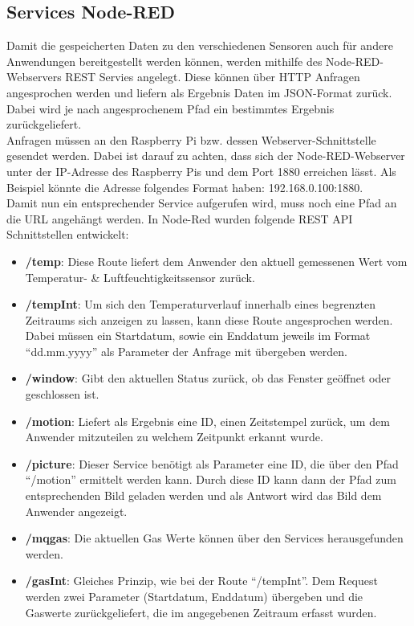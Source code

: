 \subsection{Services Node-RED}
Damit die gespeicherten Daten zu den verschiedenen Sensoren auch für andere Anwendungen bereitgestellt werden können, werden mithilfe des Node-RED-Webservers REST Servies angelegt. Diese können über \ac{HTTP} Anfragen angesprochen werden und liefern als Ergebnis Daten im \ac{JSON}-Format zurück. Dabei wird je nach angesprochenem Pfad ein bestimmtes Ergebnis zurückgeliefert. \\Anfragen müssen an den Raspberry Pi bzw. dessen Webserver-Schnittstelle gesendet werden. Dabei ist darauf zu achten, dass sich der Node-RED-Webserver unter der \ac{IP}-Adresse des Raspberry Pis und dem Port 1880 erreichen lässt. Als Beispiel könnte die Adresse folgendes Format haben: 192.168.0.100:1880. \\Damit nun ein entsprechender Service aufgerufen wird, muss noch eine Pfad an die \ac{URL} angehängt werden. In Node-Red wurden folgende REST \ac{API} Schnittstellen entwickelt:
\begin{itemize}
	\item \textbf{/temp}: Diese Route liefert dem Anwender den aktuell gemessenen Wert vom Temperatur- \& Luftfeuchtigkeitssensor  zurück. 
	\item \textbf{/tempInt}: Um sich den Temperaturverlauf innerhalb eines begrenzten Zeitraums sich anzeigen zu lassen, kann diese Route angesprochen werden. Dabei müssen ein Startdatum, sowie ein Enddatum jeweils im Format \enquote{dd.mm.yyyy} als Parameter der Anfrage mit übergeben werden.
	\item \textbf{/window}: Gibt den aktuellen Status zurück, ob das Fenster geöffnet oder geschlossen ist.
	\item \textbf{/motion}: Liefert als Ergebnis eine ID, einen Zeitstempel zurück, um dem Anwender mitzuteilen zu welchem Zeitpunkt erkannt wurde.
	\item \textbf{/picture}: Dieser Service benötigt als Parameter eine ID, die über den Pfad \enquote{/motion} ermittelt werden kann. Durch diese ID kann dann der Pfad zum entsprechenden Bild geladen werden und als Antwort wird das Bild dem Anwender angezeigt.
	\item \textbf{/mqgas}: Die aktuellen Gas Werte können über den Services herausgefunden werden.
	\item \textbf{/gasInt}: Gleiches Prinzip, wie bei der Route \enquote{/tempInt}. Dem Request werden zwei Parameter (Startdatum, Enddatum) übergeben und die Gaswerte zurückgeliefert, die im angegebenen Zeitraum erfasst wurden.
\end{itemize}

